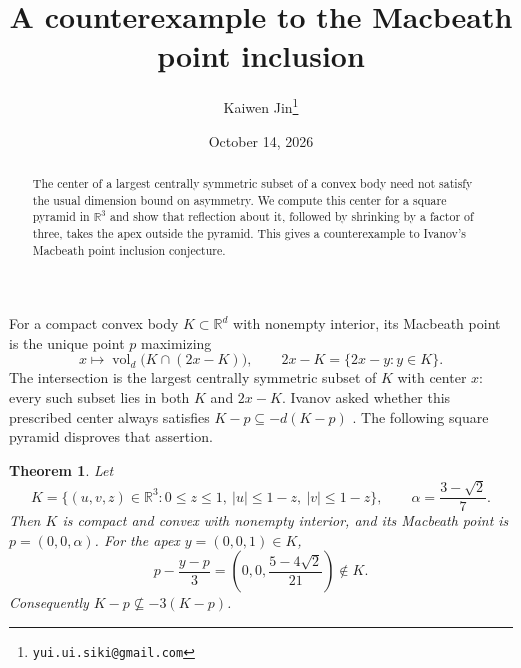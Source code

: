 \documentclass[11pt]{article}
\title{A counterexample to the Macbeath point inclusion}
\author{Kaiwen Jin\thanks{\texttt{yui.ui.siki@gmail.com}}}
\date{October 14, 2026}
\newtheorem{theorem}{Theorem}
\newcommand{\vol}{\operatorname{vol}}
\begin{document}
\maketitle
\begin{abstract}
The center of a largest centrally symmetric subset of a convex body need
not satisfy the usual dimension bound on asymmetry. We compute this center
for a square pyramid in $\mathbb R^3$ and show that reflection about it,
followed by shrinking by a factor of three, takes the apex outside the
pyramid. This gives a counterexample to Ivanov's Macbeath point inclusion
conjecture.
\end{abstract}

For a compact convex body $K\subset\mathbb R^d$ with nonempty interior,
its Macbeath point is the unique point $p$ maximizing
\[
 x\longmapsto\vol_d\bigl(K\cap(2x-K)\bigr),
 \qquad 2x-K=\{2x-y:y\in K\}.
\]
The intersection is the largest centrally symmetric subset of $K$ with
center $x$: every such subset lies in both $K$ and $2x-K$.
Ivanov asked whether this prescribed center always satisfies
$K-p\subseteq-d(K-p)$ \cite[Conjecture~2.1]{Ivanov}.
The following square pyramid disproves that assertion.

\begin{theorem}\label{thm:counterexample}
Let
\begin{equation}\label{eq:body}
 K=\bigl\{(u,v,z)\in\mathbb R^3:
  0\le z\le1,\ |u|\le1-z,\ |v|\le1-z\bigr\},
 \qquad \alpha=\frac{3-\sqrt2}{7}.
\end{equation}
Then $K$ is compact and convex with nonempty interior, and its Macbeath
point is $p=(0,0,\alpha)$. For the apex $y=(0,0,1)\in K$,
\begin{equation}\label{eq:witness}
 p-\frac{y-p}{3}
 =\left(0,0,\frac{5-4\sqrt2}{21}\right)\notin K.
\end{equation}
Consequently $K-p\nsubseteq-3(K-p)$.
\end{theorem}
\end{document}
